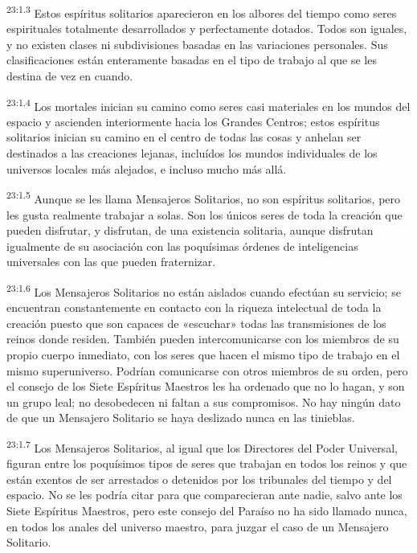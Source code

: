 \par
\textsuperscript{23:1.3} Estos espíritus solitarios aparecieron en los albores del tiempo como seres espirituales totalmente desarrollados y perfectamente dotados. Todos son iguales, y no existen clases ni subdivisiones basadas en las variaciones personales. Sus clasificaciones están enteramente basadas en el tipo de trabajo al que se les destina de vez en cuando.

\par
\textsuperscript{23:1.4} Los mortales inician su camino como seres casi materiales en los mundos del espacio y ascienden interiormente hacia los Grandes Centros; estos espíritus solitarios inician su camino en el centro de todas las cosas y anhelan ser destinados a las creaciones lejanas, incluídos los mundos individuales de los universos locales más alejados, e incluso mucho más allá.

\par
\textsuperscript{23:1.5} Aunque se les llama Mensajeros Solitarios, no son espíritus solitarios, pero les gusta realmente trabajar a solas. Son los únicos seres de toda la creación que pueden disfrutar, y disfrutan, de una existencia solitaria, aunque disfrutan igualmente de su asociación con las poquísimas órdenes de inteligencias universales con las que pueden fraternizar.

\par
\textsuperscript{23:1.6} Los Mensajeros Solitarios no están aislados cuando efectúan su servicio; se encuentran constantemente en contacto con la riqueza intelectual de toda la creación puesto que son capaces de «escuchar» todas las transmisiones de los reinos donde residen. También pueden intercomunicarse con los miembros de su propio cuerpo inmediato, con los seres que hacen el mismo tipo de trabajo en el mismo superuniverso. Podrían comunicarse con otros miembros de su orden, pero el consejo de los Siete Espíritus Maestros les ha ordenado que no lo hagan, y son un grupo leal; no desobedecen ni faltan a sus compromisos. No hay ningún dato de que un Mensajero Solitario se haya deslizado nunca en las tinieblas.

\par
\textsuperscript{23:1.7} Los Mensajeros Solitarios, al igual que los Directores del Poder Universal, figuran entre los poquísimos tipos de seres que trabajan en todos los reinos y que están exentos de ser arrestados o detenidos por los tribunales del tiempo y del espacio. No se les podría citar para que comparecieran ante nadie, salvo ante los Siete Espíritus Maestros, pero este consejo del Paraíso no ha sido llamado nunca, en todos los anales del universo maestro, para juzgar el caso de un Mensajero Solitario.


